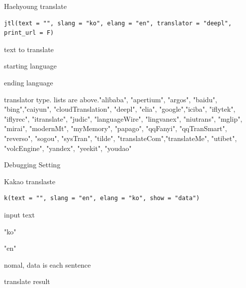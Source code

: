 \documentclass[a4paper]{book}
\begin{document}
%
\begin{Description}
Haehyoung translate
\end{Description}
%
\begin{Usage}
\begin{verbatim}
jtl(text = "", slang = "ko", elang = "en", translator = "deepl", print_url = F)
\end{verbatim}
\end{Usage}
%
\begin{Arguments}
\begin{ldescription}
\item[\code{text}] text to translate

\item[\code{slang}] starting language

\item[\code{elang}] ending language

\item[\code{translator}] translator type. lists are above."alibaba", "apertium", "argos", "baidu", "bing","caiyun", "cloudTranslation", "deepl", "elia", "google","iciba", "iflytek", "iflyrec", "itranslate", "judic", "languageWire", "lingvanex", "niutrans", "mglip", "mirai", "modernMt", "myMemory", "papago", "qqFanyi", "qqTranSmart", "reverso", "sogou", "sysTran", "tilde", "translateCom","translateMe", "utibet", "volcEngine", "yandex", "yeekit", "youdao"

\item[\code{print\_url}] Debugging Setting
\end{ldescription}
\end{Arguments}

%
\begin{Description}
Kakao translaste
\end{Description}
%
\begin{Usage}
\begin{verbatim}
k(text = "", slang = "en", elang = "ko", show = "data")
\end{verbatim}
\end{Usage}
%
\begin{Arguments}
\begin{ldescription}
\item[\code{text}] input text

\item[\code{slang}] "ko"

\item[\code{elang}] "en"

\item[\code{show}] nomal, data is each sentence
\end{ldescription}
\end{Arguments}
%
\begin{Value}
translate result
\end{Value}
\end{document}
